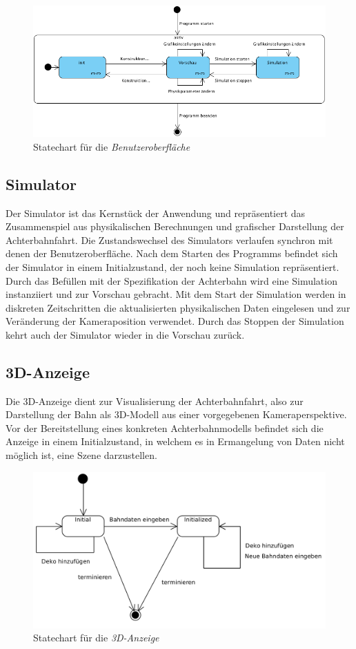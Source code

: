 \begin{figure}
\includegraphics[width=\linewidth]{bilder/StateChart_GUI}
\caption{Statechart für die \textit{Benutzeroberfläche}}
\end{figure}

\subsection{Simulator}
Der Simulator ist das Kernstück der Anwendung und repräsentiert das Zusammenspiel aus physikalischen Berechnungen
und grafischer Darstellung der Achterbahnfahrt. Die Zustandswechsel des Simulators verlaufen synchron mit 
denen der Benutzeroberfläche. Nach dem Starten des Programms befindet sich der Simulator in einem Initialzustand,
der noch keine Simulation repräsentiert. Durch das Befüllen mit der Spezifikation der Achterbahn wird
eine Simulation instanziiert und zur Vorschau gebracht. Mit dem Start der Simulation werden in diskreten Zeitschritten
die aktualisierten physikalischen Daten eingelesen und zur Veränderung der Kameraposition verwendet. Durch das
Stoppen der Simulation kehrt auch der Simulator wieder in die Vorschau zurück.

\newpage

\subsection{3D-Anzeige}
Die 3D-Anzeige dient zur Visualisierung der Achterbahnfahrt, also zur Darstellung der Bahn als 3D-Modell aus
einer vorgegebenen Kameraperspektive. Vor der Bereitstellung eines konkreten Achterbahnmodells befindet sich
die Anzeige in einem Initialzustand, in welchem es in Ermangelung von Daten nicht möglich ist, eine Szene darzustellen. 

\begin{figure}
\includegraphics[width=\linewidth]{bilder/statechart_3dgraphics}
\caption{Statechart für die \textit{3D-Anzeige}}
\end{figure}

